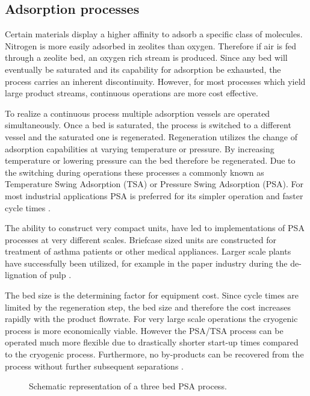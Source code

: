         \subsection{Adsorption processes}
        \label{sec:psa}
        Certain materials display a higher affinity to adsorb a specific class of molecules. Nitrogen is
        more easily adsorbed in zeolites than oxygen. Therefore if air is fed through a
        zeolite bed, an oxygen rich stream is produced. Since any bed will eventually
        be saturated and its capability for adsorption be exhausted, the process carries an
        inherent discontinuity. However, for most processes which yield large product streams,
        continuous operations are more cost effective.
    
        To realize a continuous process multiple adsorption vessels are operated simultaneously.
        Once a bed is saturated, the process is switched to a different vessel and the saturated one
        is regenerated. Regeneration utilizes the change of adsorption capabilities at varying temperature
        or pressure. By increasing temperature or lowering pressure can the bed therefore be regenerated.
        Due to the switching during operations these processes a commonly known as Temperature Swing Adsorption
        (TSA) or Pressure Swing Adsorption (PSA). For most industrial applications PSA is preferred for its
        simpler operation and faster cycle times \cite{Smith.2001}.
    
        The ability to construct very compact units, have led to implementations of PSA processes at
        very different scales. Briefcase sized units are constructed for treatment of asthma patients or other
        medical appliances. Larger scale plants have successfully been utilized, for example in the paper industry
        during the de-lignation of pulp \cite{Nelson.1993}.
    
        The bed size is the determining factor for equipment cost. Since cycle times are limited by the regeneration
        step, the bed size and therefore the cost increases rapidly with the product flowrate. For very large
        scale operations the cryogenic process is more economically viable. However the PSA/TSA process can be operated
        much more flexible due to drastically shorter start-up times compared to the cryogenic process. Furthermore, no
        by-products can be recovered from the process without further subsequent separations \cite{Choi.2003}.
    
        \begin{figure}
        	\center
        	
        	\caption{Schematic representation of a three bed PSA process.}
        	\label{fig:PSA}
        \end{figure}
    
